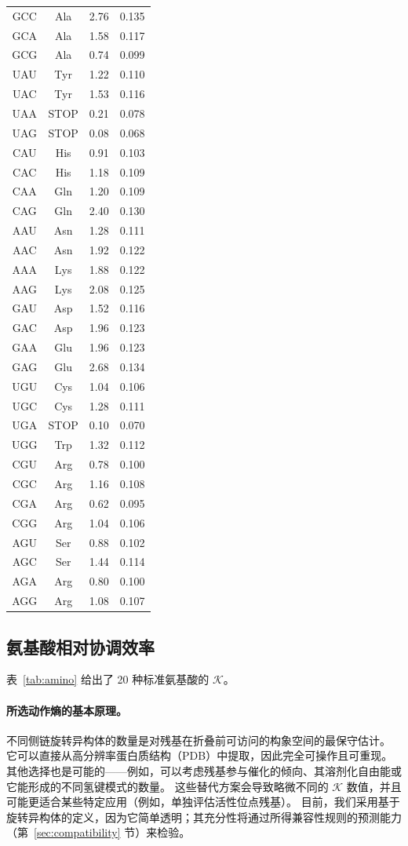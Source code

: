 \documentclass[12pt,a4paper]{article}
\newcommand{\REL}{\mathcal{K}}          %
\begin{document}
\begin{longtable}{|c|c|c|c|}
		GCC & Ala & 2.76 & 0.135 \\
		GCA & Ala & 1.58 & 0.117 \\
		GCG & Ala & 0.74 & 0.099 \\
		UAU & Tyr & 1.22 & 0.110 \\
		UAC & Tyr & 1.53 & 0.116 \\
		UAA & STOP & 0.21 & 0.078 \\
		UAG & STOP & 0.08 & 0.068 \\
		CAU & His & 0.91 & 0.103 \\
		CAC & His & 1.18 & 0.109 \\
		CAA & Gln & 1.20 & 0.109 \\
		CAG & Gln & 2.40 & 0.130 \\
		AAU & Asn & 1.28 & 0.111 \\
		AAC & Asn & 1.92 & 0.122 \\
		AAA & Lys & 1.88 & 0.122 \\
		AAG & Lys & 2.08 & 0.125 \\
		GAU & Asp & 1.52 & 0.116 \\
		GAC & Asp & 1.96 & 0.123 \\
		GAA & Glu & 1.96 & 0.123 \\
		GAG & Glu & 2.68 & 0.134 \\
		UGU & Cys & 1.04 & 0.106 \\
		UGC & Cys & 1.28 & 0.111 \\
		UGA & STOP & 0.10 & 0.070 \\
		UGG & Trp & 1.32 & 0.112 \\
		CGU & Arg & 0.78 & 0.100 \\
		CGC & Arg & 1.16 & 0.108 \\
		CGA & Arg & 0.62 & 0.095 \\
		CGG & Arg & 1.04 & 0.106 \\
		AGU & Ser & 0.88 & 0.102 \\
		AGC & Ser & 1.44 & 0.114 \\
		AGA & Arg & 0.80 & 0.100 \\
		AGG & Arg & 1.08 & 0.107 \\
		\hline
	\end{longtable}
	
	\subsection{氨基酸相对协调效率}
	\label{sec:aminoacids}
	表~\ref{tab:amino} 给出了 20 种标准氨基酸的 \(\REL\)。
	
	\paragraph{所选动作熵的基本原理。}
	不同侧链旋转异构体的数量是对残基在折叠前可访问的构象空间的最保守估计。
	它可以直接从高分辨率蛋白质结构（PDB）中提取，因此完全可操作且可重现。
	其他选择也是可能的——例如，可以考虑残基参与催化的倾向、其溶剂化自由能或它能形成的不同氢键模式的数量。
	这些替代方案会导致略微不同的 \(\REL\) 数值，并且可能更适合某些特定应用（例如，单独评估活性位点残基）。
	目前，我们采用基于旋转异构体的定义，因为它简单透明；其充分性将通过所得兼容性规则的预测能力（第~\ref{sec:compatibility} 节）来检验。
	
\end{document}
